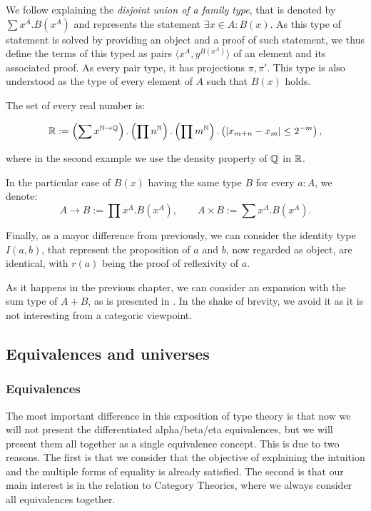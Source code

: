 We follow explaining the \emph{disjoint union of a family type}, that is denoted by $\sum x^A. B(x^A)$ and represents the statement $\exists x \in A : B(x)$. As this type of statement is solved by providing an object and a proof of such statement, we thus define the terms of this typed as pairs $\langle x^A, y^{B(x^A)}\rangle$ of an element and its associated proof. As every pair type, it has projections $\pi,\pi'$. This type is also understood as the type of every element of $A$ such that $B(x)$ holds.

\begin{example}
 The set of every real number is:

    $$\mathbb{R} := \left(\sum x^{\mathbb{N}\to\mathbb{Q}}\right).\left(\prod n^{\mathbb{N}}\right).\left(\prod m^{\mathbb{N}}\right).\left(|x_{m+n} - x_m| \le 2^{-m}\right),$$
    
  where in the second example we use the density property of $\mathbb{Q}$ in $\mathbb{R}$.\\
\end{example}

In the particular case of $B(x)$ having the same type $B$ for every $a:A$, we denote:
$$A\to B:= \prod x^A. B(x^A),\qquad A\times B := \sum x^A. B(x^A).$$

Finally, as a mayor difference from previously, we can consider the identity type $I(a,b)$, that represent the proposition of $a$ and $b$, now regarded as object, are identical, with $r(a)$ being the proof of reflexivity of $a$. 


\begin{remark}
  As it happens in the previous chapter, we can consider an expansion with the sum type of $A+B$, as is presented in \cite[Section 1.6]{martinlof1973intuitionistic}. In the shake of brevity, we avoid it as it is not interesting from a categoric viewpoint.
\end{remark}

\subsection{Equivalences and universes}
\subsubsection{Equivalences}

The most important difference in this exposition of type theory is that now we will not present the differentiated alpha/beta/eta equivalences, but we will present them all together as a single equivalence concept. This is due to two reasons. The first is that we consider that the objective of explaining the intuition and the multiple forms of equality is already satisfied. The second is that our main interest is in the relation to Category Theorics, where we always consider all equivalences together.


